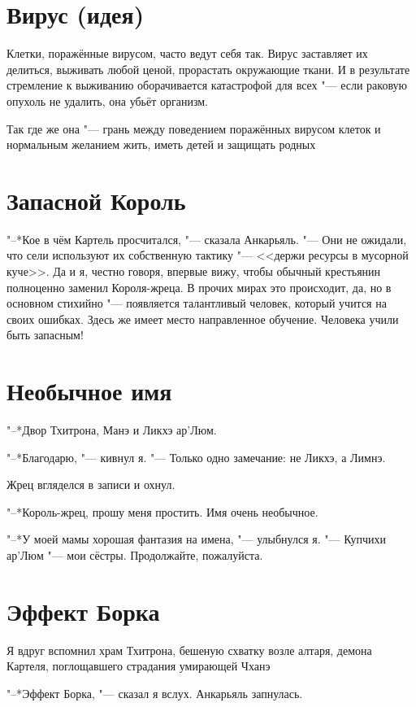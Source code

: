 \documentclass[a4paper,10pt]{book}
\newcommand{\ldotst}{\so{...}\xspace}
\newcommand{\ldotsq}{\so{?\hbox{\hspace{-.212em}}..}\xspace}
\begin{document}
\section{Вирус (идея)}

Клетки, поражённые вирусом, часто ведут себя так. Вирус заставляет их делиться, 
выживать любой ценой, прорастать окружающие ткани. И в результате стремление к 
выживанию оборачивается катастрофой для всех "--- если раковую опухоль не 
удалить, она убьёт организм.

Так где же она "--- грань между поведением поражённых вирусом клеток и 
нормальным желанием жить, иметь детей и защищать родных\ldotsq

\section{Запасной Король}

"--*Кое в чём Картель просчитался, "--- сказала Анкарьяль. "--- Они не ожидали, 
что сели используют их собственную тактику "--- <<держи ресурсы в мусорной 
куче>>. Да и я, честно говоря, впервые вижу, чтобы обычный крестьянин 
полноценно заменил Короля-жреца. В прочих мирах это происходит, да, но в 
основном стихийно "--- появляется талантливый человек, который учится на своих 
ошибках. Здесь же имеет место направленное обучение. Человека учили быть 
запасным!

\section{Необычное имя}
 
"--*Двор Тхитрона, Манэ и Ликхэ ар'Люм.

"--*Благодарю, "--- кивнул я. "--- Только одно замечание: не Ликхэ, а Лимнэ.

Жрец вгляделся в записи и охнул.

"--*Король-жрец, прошу меня простить. Имя очень необычное.

"--*У моей мамы хорошая фантазия на имена, "--- улыбнулся я. "--- Купчихи 
ар'Люм "--- мои сёстры. Продолжайте, пожалуйста.
 
\section{Эффект Борка}

Я вдруг вспомнил храм Тхитрона, бешеную схватку возле алтаря, демона Картеля, 
поглощавшего страдания умирающей Чханэ\ldotst

"--*Эффект Борка, "--- сказал я вслух. Анкарьяль запнулась.
\end{document}
